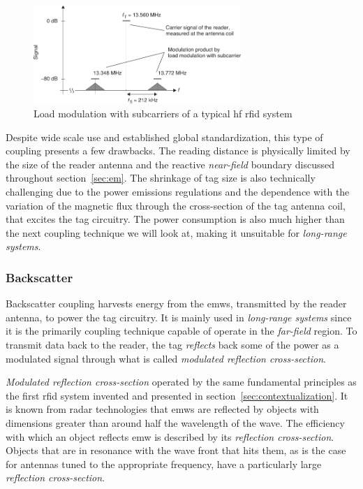 \begin{figure}[!ht]
    \centering
    \includegraphics[width=0.7\textwidth]{./figs/02-state-of-the-art/loadmodulation_sidebands.pdf}
    \caption[Load modulation with subcarriers of a typical \ac{hf} \ac{rfid} system]{Load modulation with subcarriers of a typical \ac{hf} \ac{rfid} system~\cite{finkenzellerRFIDHandbookFundamentals2003}} 
    \label{fig:loadmodulationsidebands}
\end{figure}

Despite wide scale use and established global standardization, this type of coupling presents a few drawbacks. The reading distance is physically limited by the size of the reader antenna and the reactive \emph{near-field} boundary discussed throughout section~\ref{sec:em}. The shrinkage of tag size is also technically challenging due to the power emissions regulations and the dependence with the variation of the magnetic flux through the cross-section of the tag antenna coil, that excites the tag circuitry. The power consumption is also much higher than the next coupling technique we will look at, making it unsuitable for \emph{long-range systems}.

\subsubsection{Backscatter}

Backscatter coupling harvests energy from the \acp{emw}, transmitted by the reader antenna, to power the tag circuitry. It is mainly used in \emph{long-range systems} since it is the primarily coupling technique capable of operate in the \emph{far-field} region.
To transmit data back to the reader, the tag \textit{reflects} back some of the power as a modulated signal through what is called \emph{modulated reflection cross-section}.

\emph{Modulated reflection cross-section} operated by the same fundamental principles as the first \ac{rfid} system invented and presented in section~\ref{sec:contextualization}.
It is known from radar technologies that \acp{emw} are reflected by objects with dimensions greater than around half the wavelength of the wave.
The efficiency with which an object reflects \ac{emw} is described by its \emph{reflection cross-section}. Objects that are in resonance with the wave front that hits them, as is the case for antennas tuned to the appropriate frequency, have a particularly large \emph{reflection cross-section}.

